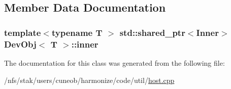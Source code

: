 \subsection{Member Data Documentation}
\hypertarget{classDevObj_ac8124c7da44aea36ee406d52f1a58db4}{
\subsubsection[{inner}]{\setlength{\rightskip}{0pt plus 5cm}template$<$typename T $>$ std\-::shared\-\_\-ptr$<${\bf Inner}$>$ {\bf Dev\-Obj}$<$ T $>$\-::inner\hspace{0.3cm}{\ttfamily [protected]}}}\label{classDevObj_ac8124c7da44aea36ee406d52f1a58db4}


The documentation for this class was generated from the following file\-:\begin{DoxyCompactItemize}
\item 
/nfs/stak/users/cuneob/harmonize/code/util/\hyperlink{host_8cpp}{host.\-cpp}\end{DoxyCompactItemize}
